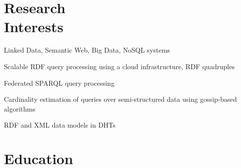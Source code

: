 \documentclass[margin,line]{resume}
\begin{document}
\address{
+1-816-255-0338 \ \ \ \ \ vgslavov@umkc.edu \ \ \ \ \ http://about.me/vgs
}
\begin{resume}

%

    \section{\mysidestyle Research\\Interests}
    \begin{list3}
        \item Linked Data, Semantic Web, Big Data, NoSQL systems
        \item Scalable RDF query processing using a cloud infrastructure, RDF quadruples
        \item Federated SPARQL query processing
        \item Cardinality estimation of queries over semi-structured data using gossip-based algorithms
        \item RDF and XML data models in DHTs
    \end{list3}\vspace{-1.5mm}
   
    \section{\mysidestyle Education}


\end{resume}
\end{document}
